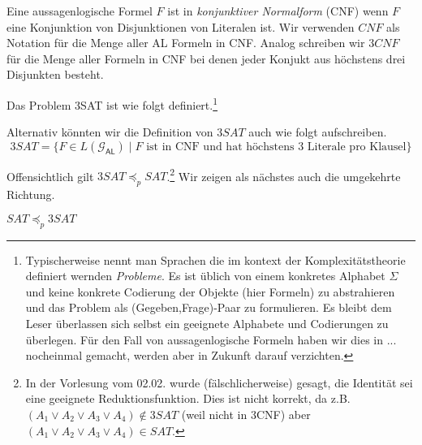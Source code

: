 Eine aussagenlogische Formel $F$ ist in \emph{konjunktiver Normalform} (CNF) wenn $F$ eine Konjunktion von Disjunktionen von Literalen ist.
Wir verwenden $CNF$ als Notation für die Menge aller AL Formeln in CNF.
Analog schreiben wir $3CNF$ für die Menge aller Formeln in CNF bei denen jeder Konjukt aus höchstens drei Disjunkten besteht.



\begin{Def}[name={[$3SAT$]}]
Das Problem 3SAT ist wie folgt definiert.\footnote{
Typischerweise nennt man Sprachen die im kontext der Komplexitätstheorie definiert wernden \emph{Probleme}.
Es ist üblich von einem konkretes Alphabet $\Sigma$ und keine konkrete Codierung der Objekte (hier Formeln) zu abstrahieren und das Problem als (Gegeben,Frage)-Paar zu formulieren.
Es bleibt dem Leser überlassen sich selbst ein geeignete Alphabete und Codierungen zu überlegen.
Für den Fall von aussagenlogische Formeln haben wir dies in ... nocheinmal gemacht, werden aber in Zukunft darauf verzichten. }
\begin{center}
\end{center}
	
\end{Def}
Alternativ könnten wir die Definition von $3SAT$ auch wie folgt aufschreiben.
$$3SAT = \{F\in L(\mathcal{G}_\mathsf{AL})\mid F \text{ ist in CNF und hat höchstens 3 Literale pro Klausel}\}$$

Offensichtlich gilt $3SAT \preceq_p SAT$.\footnote{
In der Vorlesung vom 02.02. wurde (fälschlicherweise) gesagt, die Identität sei eine geeignete Reduktionsfunktion.
Dies ist nicht korrekt, da z.B. 
$(A_1\lor A_2\lor A_3\lor A_4)\notin 3SAT$
(weil nicht in 3CNF) aber $(A_1\lor A_2\lor A_3\lor A_4)\in SAT$.
} Wir zeigen als nächstes auch die umgekehrte Richtung.

\begin{lemma}
	$SAT \preceq_p 3SAT$
\end{lemma}


